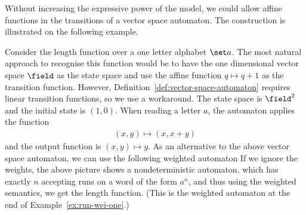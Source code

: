 \begin{example}\label{ex:weighted-length} Without increasing the expressive power of the model, we could allow affine functions in the transitions of a vector space automaton.  The construction is illustrated on the following example.

	Consider the length function over a one letter alphabet $\set a$. The most natural approach to recognise this function  would be to have the one dimensional vector space $\field$ as the state space and use the affine function $q \mapsto q+1$ as the transition function. However, Definition~\ref{def:vector-space-automaton} requires linear transition functions, so we use a workaround.
	The state space is $\field^2$ and the initial state is $(1,0)$. When reading a letter $a$, the automaton applies the function
	\begin{align*}
  (x,y) \mapsto (x,x+y)
\end{align*}
and the output function is $(x,y) \mapsto y$. 
As an alternative to the above vector space automaton, we can use the following weighted automaton 
If we ignore the weights, the above picture shows a nondeterministic automaton, which has exactly $n$ accepting runs on a word of the form $a^n$, and thus using the weighted semantics, we get the length function. (This is the weighted automaton at the end of Example~\ref{ex:run-wei-one}.)
\end{example}



